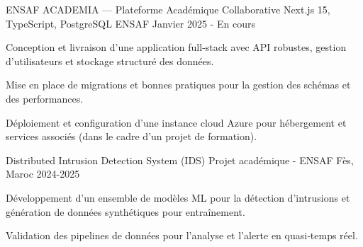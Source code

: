 
\begin{cventries}

    \cventry
    {ENSAF ACADEMIA — Plateforme Académique Collaborative} %
    {Next.js 15, TypeScript, PostgreSQL} %
    {ENSAF} %
    {Janvier 2025 - En cours} %
    {
        \begin{cvitems}
            \item {Conception et livraison d'une application full‑stack avec API robustes, gestion d'utilisateurs et stockage structuré des données.}
            \item {Mise en place de migrations et bonnes pratiques pour la gestion des schémas et des performances.}
            \item {Déploiement et configuration d'une instance cloud Azure pour hébergement et services associés (dans le cadre d'un projet de formation).}
        \end{cvitems}
    }

    \cventry
    {Distributed Intrusion Detection System (IDS)} %
    {Projet académique - ENSAF} %
    {Fès, Maroc} %
    {2024-2025} %
    {
        \begin{cvitems}
            \item {Développement d'un ensemble de modèles ML pour la détection d'intrusions et génération de données synthétiques pour entraînement.}
            \item {Validation des pipelines de données pour l'analyse et l'alerte en quasi‑temps réel.}
        \end{cvitems}
    }

\end{cventries}
